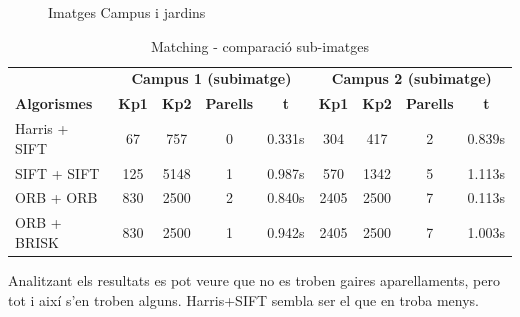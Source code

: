 		\begin{figure}[!htb]
			\caption{Imatges Campus i jardins}
		\end{figure}

		\begin{table}[H]
			\begin{center}
				\begin{tabular}{l | c c c c | c c c c}
					& \multicolumn{4}{c|}{\textbf{Campus 1 (subimatge)}} & \multicolumn{4}{c}{\textbf{Campus 2 (subimatge)}} \\
					\textbf{Algorismes} & \textbf{Kp1} & \textbf{Kp2} & \textbf{Parells} & \textbf{t} & \textbf{Kp1} & \textbf{Kp2} & \textbf{Parells} & \textbf{t} \\ \hline
					Harris + SIFT & 67 & 757 & 0 & 0.331s & 304 & 417 & 2 & 0.839s \\
					SIFT + SIFT & 125 & 5148 & 1 & 0.987s & 570 & 1342 & 5 & 1.113s \\
					ORB + ORB & 830 & 2500 & 2 & 0.840s & 2405 & 2500 & 7 & 0.113s \\
					ORB + BRISK & 830 & 2500 & 1 & 0.942s & 2405 & 2500 & 7 & 1.003s \\
				\end{tabular}
			\end{center}
			\caption{Matching - comparació sub-imatges}
		\end{table}
		\noindent
		Analitzant els resultats es pot veure que no es troben gaires aparellaments, pero tot i així s'en troben alguns. Harris+SIFT sembla ser el que en troba menys.

\newpage
